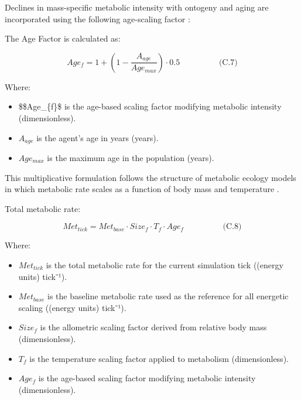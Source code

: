 \documentclass[
]{book}
\begin{document}
Declines in mass-specific metabolic intensity with ontogeny and aging
are incorporated using the following age-scaling factor
\citep{glazier_beyond_2005, glazier_relevance_2023}:

The Age Factor is calculated as:

\[
\begin{equation} Age_{f} = 1 + \left(1 - \frac{A_{age}}{Age_{max}}\right)\cdot 0.5  \hspace{2cm} \text{(C.7)} \end{equation}
\]

Where:

\begin{itemize}
\item
  \$\$Age\_\{f\}\$ is the age-based scaling factor modifying metabolic
  intensity (dimensionless).
\item
  \(A_{age}\) is the agent's age in years (years).
\item
  \(Age_{max}\) is the maximum age in the population (years).
\end{itemize}

This multiplicative formulation follows the structure of metabolic
ecology models in which metabolic rate scales as a function of body mass
and temperature \citep{brown_toward_2004}.

Total metabolic rate:

\[
\begin{equation} Met_{tick} = Met_{base} \cdot 
Size_{f} \cdot 
T_{f} \cdot 
Age_{f}  \hspace{2cm} \text{(C.8)} \end{equation}
\]

Where:

\begin{itemize}
\item
  \(Met_{tick}\) is the total metabolic rate for the current simulation
  tick ((energy units) tick⁻¹).
\item
  \(Met_{base}\) is the baseline metabolic rate used as the reference
  for all energetic scaling ((energy units) tick⁻¹).
\item
  \(Size_{f}\) is the allometric scaling factor derived from relative
  body mass (dimensionless).
\item
  \(T_{f}\) is the temperature scaling factor applied to metabolism
  (dimensionless).
\item
  \(Age_{f}\) is the age-based scaling factor modifying metabolic
  intensity (dimensionless).
\end{itemize}
\end{document}
